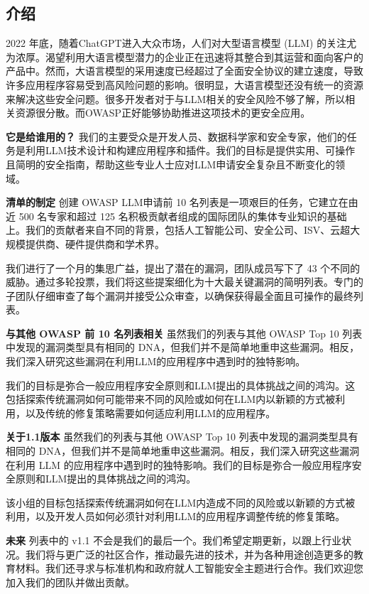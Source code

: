 \documentclass[
]{article}
\author{}
\date{}
\begin{document}
\subsection{介绍}\label{ux4ecbux7ecd}

2022 年底，随着ChatGPT进入大众市场，人们对大型语言模型 (LLM)
的关注尤为浓厚。渴望利用大语言模型潜力的企业正在迅速将其整合到其运营和面向客户的产品中。然而，大语言模型的采用速度已经超过了全面安全协议的建立速度，导致许多应用程序容易受到高风险问题的影响。很明显，大语言模型还没有统一的资源来解决这些安全问题。很多开发者对于与LLM相关的安全风险不够了解，所以相关资源很分散。而OWASP正好能够协助推进这项技术的更安全应用。

\textbf{它是给谁用的？}
我们的主要受众是开发人员、数据科学家和安全专家，他们的任务是利用LLM技术设计和构建应用程序和插件。我们的目标是提供实用、可操作且简明的安全指南，帮助这些专业人士应对LLM申请安全复杂且不断变化的领域。

\textbf{清单的制定} 创建 OWASP LLM申请前 10
名列表是一项艰巨的任务，它建立在由近 500 名专家和超过 125
名积极贡献者组成的国际团队的集体专业知识的基础上。我们的贡献者来自不同的背景，包括人工智能公司、安全公司、ISV、云超大规模提供商、硬件提供商和学术界。

我们进行了一个月的集思广益，提出了潜在的漏洞，团队成员写下了 43
个不同的威胁。通过多轮投票，我们将这些提案细化为十大最关键漏洞的简明列表。专门的子团队仔细审查了每个漏洞并接受公众审查，以确保获得最全面且可操作的最终列表。

\textbf{与其他 OWASP 前 10 名列表相关} 虽然我们的列表与其他 OWASP Top 10
列表中发现的漏洞类型具有相同的
DNA，但我们并不是简单地重申这些漏洞。相反，我们深入研究这些漏洞在利用LLM的应用程序中遇到时的独特影响。

我们的目标是弥合一般应用程序安全原则和LLM提出的具体挑战之间的鸿沟。这包括探索传统漏洞如何可能带来不同的风险或如何在LLM内以新颖的方式被利用，以及传统的修复策略需要如何适应利用LLM的应用程序。

\textbf{关于1.1版本} 虽然我们的列表与其他 OWASP Top 10
列表中发现的漏洞类型具有相同的
DNA，但我们并不是简单地重申这些漏洞。相反，我们深入研究这些漏洞在利用
LLM
的应用程序中遇到时的独特影响。我们的目标是弥合一般应用程序安全原则和LLM提出的具体挑战之间的鸿沟。

该小组的目标包括探索传统漏洞如何在LLM内造成不同的风险或以新颖的方式被利用，以及开发人员如何必须针对利用LLM的应用程序调整传统的修复策略。

\textbf{未来} 列表中的 v1.1
不会是我们的最后一个。我们希望定期更新，以跟上行业状况。我们将与更广泛的社区合作，推动最先进的技术，并为各种用途创造更多的教育材料。我们还寻求与标准机构和政府就人工智能安全主题进行合作。我们欢迎您加入我们的团队并做出贡献。
\end{document}
